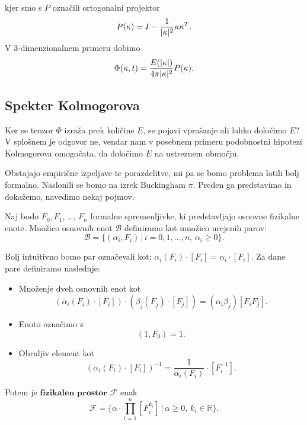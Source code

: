 \documentclass[mat2, tisk]{fmfdelo}
\newcommand{\R}{\mathbb R}
\newcommand{\bd}{\textbf}
\begin{document}
kjer smo s $P$ označili ortogonalni projektor 
$$
P(\text{\bd{$\kappa$}}) = I - \frac{1}{|\text{\bd{$\kappa$}}|^2}\text{\bd{$\kappa$}} \text{\bd{$\kappa$}}^T.
$$
V $3$-dimenzionalnem primeru dobimo 
\begin{equation*}
\Phi(\text{\bd{$\kappa$}}, t) = \frac{E(|\text{\bd{$\kappa$}}|)}{4\pi |\text{\bd{$\kappa$}}|^2}P(\text{\bd{$\kappa$}}).
\end{equation*}

\subsection{Spekter Kolmogorova}
\label{Buck}

Ker se tenzor $\Phi$ izraža prek količine $E$, se pojavi vprašanje 
ali lahko določimo $E$? V splošnem je odgovor ne, vendar nam v posebnem 
primeru podobnostni hipotezi Kolmogorova omogočata, da določimo
$E$ na ustreznem območju.

Obstajajo empirične izpeljave te porazdelitve, mi pa se bomo problema lotili 
bolj formalno. Naslonili se bomo na izrek Buckingham $\pi$.
Preden ga predstavimo in dokažemo, navedimo nekaj pojmov. 

\begin{definicija}
Naj bodo $F_0, F_1$, \dots, $F_n$ formalne spremenljivke, ki predstavljajo 
osnovne fizikalne enote. Množico osnovnih enot $\mathcal{B}$ definiramo kot 
množico urejenih parov: 
$$
\mathcal{B} = \{(\alpha_i, F_i) \,|\, i= 0, 1, \dots, n, \, \alpha_i \geq 0\} .
$$

Bolj intuitivno bomo par označevali kot: $\alpha_i(F_i)\cdot [F_i] = \alpha_i \cdot [F_i]$. 
Za dane pare definiramo naslednje:
\begin{itemize}
  \item Množenje dveh osnovnih enot kot  
  $$
  (\alpha_i(F_i)\cdot [F_i]) \cdot (\beta_j(F_j)\cdot [F_j]) = (\alpha_i \beta_j)[F_i F_j].
  $$
  \item Enoto označimo z 
  $$
  (1, F_0) = 1.
  $$
  \item Obrnljiv element kot 
  $$
  (\alpha_i(F_i)\cdot [F_i])^{-1} = \frac{1}{\alpha_i{(F_i)}} \cdot [F_i^{-1}].
  $$

\end{itemize}

Potem je $\bd{fizikalen prostor}$ $\mathcal{F}$ enak 
$$
\mathcal{F} = \{\alpha \cdot \prod_{i=1}^n [F_i^{k_i}] \,|\, \alpha \geq 0,\, k_i\in \R\}.
$$
\end{definicija}
\end{document}

